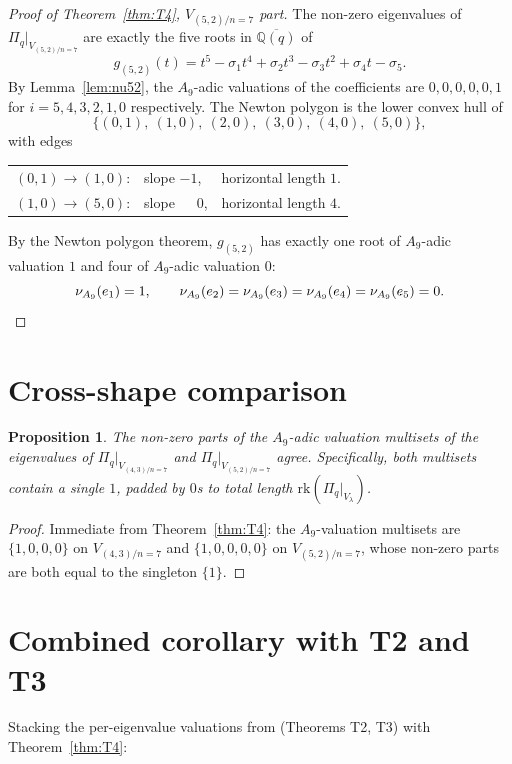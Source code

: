 \documentclass[11pt]{article}
\theoremstyle{plain}
\newtheorem{proposition}[theorem]{Proposition}
\theoremstyle{definition}
\theoremstyle{remark}
\newcommand{\Q}{\mathbb{Q}}
\newcommand{\Pibs}{\Pi_q}
\newcommand{\Vlam}{V_\lambda}
\newcommand{\rk}{\mathrm{rk}}
\newcommand{\valA}{\nu_{A_9}}
\begin{document}
\begin{proof}[Proof of Theorem~\ref{thm:T4}, $V_{(5,2)/n=7}$ part]
The non-zero eigenvalues of $\Pibs|_{V_{(5,2)/n=7}}$ are exactly the five roots in
$\overline{\Q(q)}$ of
\[ g_{(5,2)}(t) = t^5 - \sigma_1 t^4 + \sigma_2 t^3 - \sigma_3 t^2 + \sigma_4 t - \sigma_5. \]
By Lemma~\ref{lem:nu52}, the $A_9$-adic valuations of the coefficients are
$0, 0, 0, 0, 0, 1$ for $i = 5, 4, 3, 2, 1, 0$ respectively.  The Newton polygon
is the lower convex hull of
\[ \big\{(0, 1),\ (1, 0),\ (2, 0),\ (3, 0),\ (4, 0),\ (5, 0)\big\}, \]
with edges
\begin{center}
\begin{tabular}{lll}
$(0,1) \to (1,0)$: & slope $-1$, & horizontal length $1$. \\
$(1,0) \to (5,0)$: & slope $\phantom{-}0$, & horizontal length $4$.
\end{tabular}
\end{center}
By the Newton polygon theorem, $g_{(5,2)}$ has exactly one root of $A_9$-adic
valuation $1$ and four of $A_9$-adic valuation $0$:
\[ \valA(e_1) = 1, \qquad \valA(e_2) = \valA(e_3) = \valA(e_4) = \valA(e_5) = 0. \qedhere \]
\end{proof}

\section{Cross-shape comparison}

\begin{proposition}
\label{prop:cross-shape}
The non-zero parts of the $A_9$-adic valuation multisets of the eigenvalues of
$\Pibs|_{V_{(4,3)/n=7}}$ and $\Pibs|_{V_{(5,2)/n=7}}$ agree.  Specifically, both
multisets contain a single $1$, padded by $0$s to total length $\rk(\Pibs|_{\Vlam})$.
\end{proposition}

\begin{proof}
Immediate from Theorem~\ref{thm:T4}: the $A_9$-valuation multisets are
$\{1, 0, 0, 0\}$ on $V_{(4,3)/n=7}$ and $\{1, 0, 0, 0, 0\}$ on $V_{(5,2)/n=7}$,
whose non-zero parts are both equal to the singleton $\{1\}$.
\end{proof}

\section{Combined corollary with T2 and T3}

Stacking the per-eigenvalue valuations from \cite{Newton28} (Theorems T2, T3)
with Theorem~\ref{thm:T4}:
\end{document}
